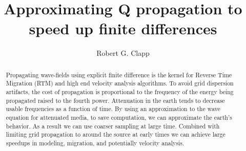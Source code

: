 \title{Approximating Q propagation to speed up finite differences}
\author{Robert G. Clapp}
\maketitle








\begin{abstract}



Propagating wave-fields using explicit finite difference is the kernel for Reverse Time Migration (RTM) and high end velocity analysis
algorithms.
To avoid grid dispersion artifacts,  the cost of propagation is proportional to the frequency of the energy being propagated raised
to the fourth power.
Attenuation in the earth tends to decrease usable frequencies as a function of time.
By using an approximation to the wave equation for attenuated media, to save computation, we can approximate the earth's behavior.
As a result we can use coarser sampling at large time. Combined
with limiting  grid propagation to around the source at early times we can achieve large speedups in modeling, migration, and potentially
velocity analysis.
\end{abstract}


